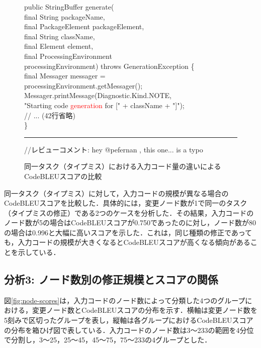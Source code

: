 \documentclass[11pt]{jreport}
\begin{document}
\begin{figure}[h]
{\begin{minipage}{0.95\linewidth}
        \ttfamily\small
public StringBuffer generate(\\
\hspace{4ex}final String packageName,\\
\hspace{4ex}final PackageElement packageElement,\\
\hspace{4ex}final String className,\\
\hspace{4ex}final Element element,\\
\hspace{4ex}final ProcessingEnvironment\\
\hspace{4ex}processingEnvironment) throws GenerationException \{\\
\hspace{4ex}final Messager messager =\\
\hspace{8ex}processingEnvironment.getMessager();\\
\hspace{4ex}Messager.printMessage(Diagnostic.Kind.NOTE,\\
\hspace{8ex}"Starting code \textcolor{red}{generation} for [" + className + "]");\\
\hspace{4ex}// ... (42行省略)\\
\}\\

        \normalfont\hrule
        //レビューコメント: hey @pefernan , this one... is a typo
    \end{minipage}}
    \caption{同一タスク（タイプミス）における入力コード量の違いによるCodeBLEUスコアの比較}
    \label{fig:code-comparison}
\end{figure}

同一タスク（タイプミス）に対して，入力コードの規模が異なる場合のCodeBLEUスコアを比較した．具体的には，変更ノード数が1で同一のタスク（タイプミスの修正）である2つのケースを分析した．その結果，入力コードのノード数が5の場合はCodeBLEUスコアが0.750であったのに対し，ノード数が80の場合は0.996と大幅に高いスコアを示した．これは，同じ種類の修正であっても，入力コードの規模が大きくなるとCodeBLEUスコアが高くなる傾向があることを示している．

\subsection {分析3: ノード数別の修正規模とスコアの関係}
図\ref{fig:node-scores}は，入力コードのノード数によって分類した4つのグループにおける，変更ノード数とCodeBLEUスコアの分布を示す．横軸は変更ノード数を5刻みで区切ったグループを表し，縦軸は各グループにおけるCodeBLEUスコアの分布を箱ひげ図で表している．入力コードのノード数は3〜233の範囲を4分位で分割し，3〜25，25〜45，45〜75，75〜233の4グループとした．
\end{document}
